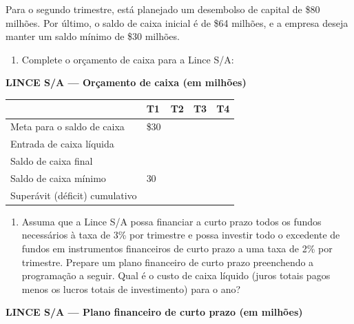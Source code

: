 \documentclass[11pt,a4paper]{article}
\providecommand{\tightlist}{\setlength{\itemsep}{0pt}\setlength{\parskip}{0pt}}
\begin{document}
Para o segundo trimestre, está planejado um desembolso de capital de \$80 milhões. Por último, o
saldo de caixa inicial é de \$64 milhões, e a empresa deseja manter um saldo mínimo de \$30 milhões.

\begin{enumerate}
\def\labelenumi{\alph{enumi}.}
\tightlist
\item
  Complete o orçamento de caixa para a Lince S/A:
\end{enumerate}

\textbf{LINCE S/A --- Orçamento de caixa (em milhões)}

{\def\LTcaptype{none} %
\begin{longtable}[]{@{}lllll@{}}
\toprule\noalign{}
& T1 & T2 & T3 & T4 \\
\midrule\noalign{}
\endhead
\bottomrule\noalign{}
\endlastfoot
Meta para o saldo de caixa & \$30 & & & \\
Entrada de caixa líquida & & & & \\
Saldo de caixa final & & & & \\
Saldo de caixa mínimo & 30 & & & \\
Superávit (déficit) cumulativo & & & & \\
\end{longtable}
}

\begin{enumerate}
\def\labelenumi{\alph{enumi}.}
\setcounter{enumi}{1}
\tightlist
\item
  Assuma que a Lince S/A possa financiar a curto prazo todos os fundos necessários à taxa de 3\% por
  trimestre e possa investir todo o excedente de fundos em instrumentos financeiros de curto prazo a
  uma taxa de 2\% por trimestre. Prepare um plano financeiro de curto prazo preenchendo a
  programação a seguir. Qual é o custo de caixa líquido (juros totais pagos menos os lucros totais
  de investimento) para o ano?
\end{enumerate}

\textbf{LINCE S/A --- Plano financeiro de curto prazo (em milhões)}
\end{document}
